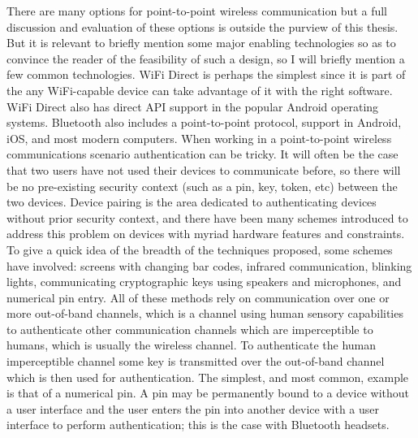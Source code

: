 \documentclass[12pt,dvips]{report}
\begin{document}
There are many options for point-to-point wireless communication but a full discussion and evaluation of these options is outside the purview of this thesis. But it is relevant to briefly mention some major enabling technologies so as to convince the reader of the feasibility of such a design, so I will briefly mention a few common technologies. WiFi Direct is perhaps the simplest since it is part of the any WiFi-capable device can take advantage of it with the right software. WiFi Direct also has direct API support in the popular Android operating systems. Bluetooth also includes a point-to-point protocol,  support in Android, iOS, and most modern computers. 
When working in a point-to-point wireless communications scenario authentication can be tricky. It will often be the case that two users have not used their devices to communicate before, so there will be no pre-existing security context (such as a pin, key, token, etc) between the two devices. 
Device pairing is the area dedicated to authenticating devices without prior security context, and there have been many schemes introduced to address this problem on devices with myriad hardware features and constraints. To give a quick idea of the breadth of the techniques proposed, some schemes have involved: screens with changing bar codes, infrared communication, blinking lights, communicating cryptographic keys using speakers and microphones, and numerical pin entry. All of these methods rely on communication over one or more out-of-band channels, which is a channel using human sensory capabilities to authenticate other communication channels which are imperceptible to humans, which is usually the wireless channel. To authenticate the human imperceptible channel some key is transmitted over the out-of-band channel which is then used for authentication. The simplest, and most common, example is that of a numerical pin. A pin may be permanently bound to a device without a user interface and the user enters the pin into another device with a user interface to perform authentication; this is the case with Bluetooth headsets.
\end{document}
